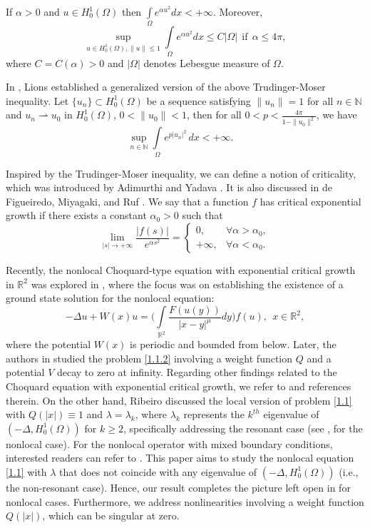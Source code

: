 \documentclass[11pt]{amsart}
\numberwithin{equation}{section}
\newcommand{\R}{\mathbb{R}}
\newcommand{\h}{H^1_0(\Omega)}
\newcommand{\1}{\frac{1}{2}}
\begin{document}
	If $\alpha>0$ and $u \in H^1_0 (\Omega)$ then $\int\limits_\Omega e^{\alpha u^2} dx < +\infty.$
	Moreover, 
	\[ \sup_{u\in H^1_0(\Omega), \|u\| \leq 1}\int\limits_\Omega e^{\alpha u^2}dx \leq C |\Omega| \ \ \text{if} \ \ \alpha \leq 4\pi,\] 
	where $C= C(\alpha)>0$ and $|\Omega|$ denotes Lebesgue measure of $\Omega$.
	
	In \cite{Lion}, Lions established a generalized version of the above Trudinger-Moser inequality. 
	Let $\{u_n\} \subset H^1_0(\Omega)$ be a sequence satisfying $\|u_n\|= 1$ for all $n\in \mathbb{N}$ and $u_n \rightharpoonup u_0 $ in $H^1_0(\Omega)$, $0< \|u_0\| <1$, then for all $ 0< p<\frac{4\pi}{1-\|u_0\|^2}$, we have
	\[\sup_{n \in \mathbb{N}} \int\limits_{\Omega} e^{ p |u_n|^2}  \,dx < +\infty. \quad\]
	
	Inspired by the Trudinger-Moser inequality, we can define a notion of criticality, which was introduced by Adimurthi and Yadava \cite{Adimurthi}. It is also discussed in de Figueiredo, Miyagaki, and Ruf \cite{Figueiredo}. We say that a function $f$ has critical exponential growth if there exists a constant $\alpha_0 >0$ such that
	\begin{equation} 
		\label{ceg}
		\lim_{|s| \rightarrow +\infty} \frac{|f(s)|}{e^{\alpha s^2}}=\begin{cases}
			0,& \forall \alpha > \alpha_0,\\
			+\infty, & \forall \alpha < \alpha_0.
		\end{cases}
	\end{equation}
	
	Recently, the nonlocal Choquard-type equation with exponential critical growth in $\R^2$ was explored in \cite{Cassani, Alves2}, where the focus was on establishing the existence of a ground state solution for the nonlocal equation:
	\begin{equation} 
		\label{1.1.2} 
		-\Delta u + W(x)u = \Bigg( \int\limits_{\R^2} \frac{F(u(y))}{|x-y|^\mu}dy \Bigg) f(u), \ \ x \in \R^2,
	\end{equation}
	where the potential $W(x)$ is periodic and bounded from below. Later, the authors in \cite{Shen} studied the problem \eqref{1.1.2} involving a weight function $Q$ and a potential $V$ decay to zero at infinity. Regarding other findings related to the Choquard equation with exponential critical growth, we refer to \cite{Alves1, Arora, Biswas} and references therein. On the other hand, Ribeiro \cite{Bruno} discussed the local version of problem \eqref{1.1} with $Q(|x|)\equiv1$ and $\lambda=\lambda_k $, where $\lambda_k$ represents the $k^{th}$ eigenvalue of $(-\Delta, \h)$ for $k\geq 2$, specifically addressing the resonant case (see \cite{Li}, for the nonlocal case). For the nonlocal operator with mixed boundary conditions, interested readers can refer to \cite{Bisci}. This paper aims to study the nonlocal equation \eqref{1.1} with $\lambda$ that does not coincide with any eigenvalue of $(-\Delta, \h)$ (i.e., the non-resonant case). Hence, our result completes the picture left open in \cite{Bruno} for nonlocal cases. Furthermore, we address nonlinearities involving a weight function $Q(|x|)$, which can be singular at zero.
	
\end{document}
